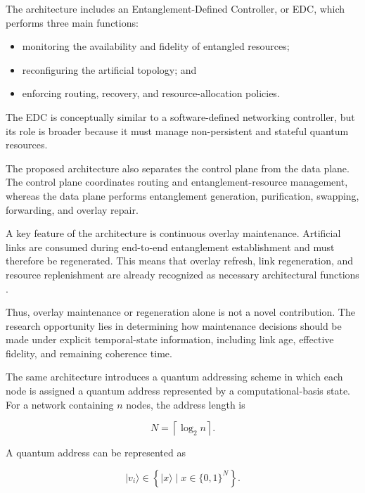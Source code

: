 The architecture includes an Entanglement-Defined Controller, or EDC, which performs three main functions:

\begin{itemize}
    \item monitoring the availability and fidelity of entangled resources;
    \item reconfiguring the artificial topology; and
    \item enforcing routing, recovery, and resource-allocation policies.
\end{itemize}

The EDC is conceptually similar to a software-defined networking controller, but its role is broader because it must manage non-persistent and stateful quantum resources.

The proposed architecture also separates the control plane from the data plane. The control plane coordinates routing and entanglement-resource management, whereas the data plane performs entanglement generation, purification, swapping, forwarding, and overlay repair.

A key feature of the architecture is continuous overlay maintenance. Artificial links are consumed during end-to-end entanglement establishment and must therefore be regenerated. This means that overlay refresh, link regeneration, and resource replenishment are already recognized as necessary architectural functions \cite{caleffi2025quantumarchitecture}.

Thus, overlay maintenance or regeneration alone is not a novel contribution. The research opportunity lies in determining how maintenance decisions should be made under explicit temporal-state information, including link age, effective fidelity, and remaining coherence time.

The same architecture introduces a quantum addressing scheme in which each node is assigned a quantum address represented by a computational-basis state. For a network containing $n$ nodes, the address length is

\begin{equation}
    N
    =
    \left\lceil
    \log_{2} n
    \right\rceil.
\end{equation}

A quantum address can be represented as

\begin{equation}
    |v_i\rangle
    \in
    \left\{
    |x\rangle
    \mid
    x \in \{0,1\}^{N}
    \right\}.
\end{equation}

